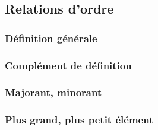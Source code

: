 \documentclass[12pt,a4paper,french]{book}
\begin{document}
		\subsection{Relations d'ordre}
			\subsubsection{Définition générale}
			\subsubsection{Complément de définition}
			\subsubsection{Majorant, minorant}
			\subsubsection{Plus grand, plus petit élément}
		
\end{document}
